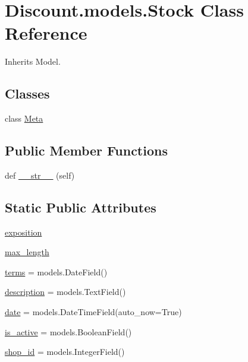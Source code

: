 \hypertarget{class_discount_1_1models_1_1_stock}{}\section{Discount.\+models.\+Stock Class Reference}
\label{class_discount_1_1models_1_1_stock}


Inherits Model.

\subsection*{Classes}
\begin{DoxyCompactItemize}
\item 
class \hyperlink{class_discount_1_1models_1_1_stock_1_1_meta}{Meta}
\end{DoxyCompactItemize}
\subsection*{Public Member Functions}
\begin{DoxyCompactItemize}
\item 
def \hyperlink{class_discount_1_1models_1_1_stock_aa1915fee04d17ce98683ce6d9068c497}{\+\_\+\+\_\+str\+\_\+\+\_\+} (self)
\end{DoxyCompactItemize}
\subsection*{Static Public Attributes}
\begin{DoxyCompactItemize}
\item 
\hyperlink{class_discount_1_1models_1_1_stock_a4e1adb7c6d95e58a1f69adcce67ca3e5}{exposition}
\item 
\hyperlink{class_discount_1_1models_1_1_stock_a80c6340b113f7c0c9e1ff7eaac895615}{max\+\_\+length}
\item 
\hyperlink{class_discount_1_1models_1_1_stock_a16676c9e0f2273d5df3290d38d84cfe8}{terms} = models.\+Date\+Field()
\item 
\hyperlink{class_discount_1_1models_1_1_stock_ab1fc46693f921b3b492984ba92f28def}{description} = models.\+Text\+Field()
\item 
\hyperlink{class_discount_1_1models_1_1_stock_a45766d05ae4d7cd8e2618e40b99df3b5}{date} = models.\+Date\+Time\+Field(auto\+\_\+now=True)
\item 
\hyperlink{class_discount_1_1models_1_1_stock_ac912fe47acfaeb38b21bf2284f0cd18f}{is\+\_\+active} = models.\+Boolean\+Field()
\item 
\hyperlink{class_discount_1_1models_1_1_stock_ad80d1016fd620f106c5ffd658776fb49}{shop\+\_\+id} = models.\+Integer\+Field()
\end{DoxyCompactItemize}


